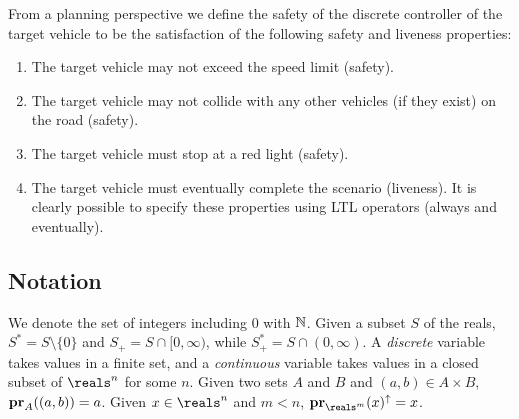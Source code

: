 From a planning perspective we define the safety of the discrete controller of the target vehicle to be the satisfaction of the following safety and liveness properties:
\begin{enumerate}
	\item The target vehicle may not exceed the speed limit (safety).
	\item The target vehicle may not collide with any other vehicles (if they exist) on the road (safety).
	\item The target vehicle must stop at a red light (safety).
	\item The target vehicle must eventually complete the scenario (liveness).
It is clearly possible to specify these properties using LTL operators (always and eventually).
\end{enumerate}

%
%
%
%

\subsection{Notation}
We denote the set of integers including 0 with $\Ne$. 
Given a subset $S$ of the reals, $S^* = S \setminus \{0\}$ and $S_+ = S \cap [0,\infty)$,
while $S_+^* = S \cap (0,\infty)$.
A \emph{discrete} variable takes values in a finite set, and a \emph{continuous} variable takes values in a closed subset of $\reals^n$ for some $n$.
Given two sets $A$ and $B$ and $(a,b) \in A\times B$, $\proj{(a,b)}{A} = a$. Given $x \in \reals^n$ and $m < n$, $\proj{x}{\reals^m}^\uparrow = x$.